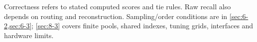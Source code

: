 Correctness refers to stated computed scores and tie rules. Raw recall also depends on routing and reconstruction. Sampling/order conditions are in \cref{sec:6-2,sec:6-3}; \cref{sec:8-3} covers finite pools, shared indexes, tuning grids, interfaces and hardware limits.